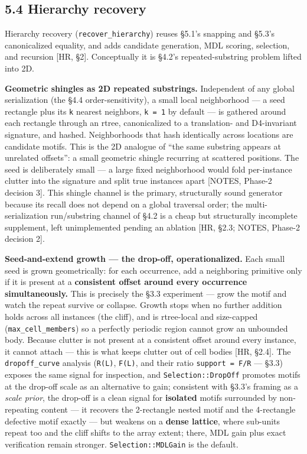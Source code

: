 \documentclass[
  11pt,
]{article}
\begin{document}
\subsection{5.4 Hierarchy recovery}\label{hierarchy-recovery-1}

Hierarchy recovery (\texttt{recover\_hierarchy}) reuses §5.1's snapping
and §5.3's canonicalized equality, and adds candidate generation, MDL
scoring, selection, and recursion {[}HR, §2{]}. Conceptually it is
§4.2's repeated-substring problem lifted into 2D.

\textbf{Geometric shingles as 2D repeated substrings.} Independent of
any global serialization (the §4.4 order-sensitivity), a small local
neighborhood --- a seed rectangle plus its \texttt{k} nearest neighbors,
\texttt{k\ =\ 1} by default --- is gathered around each rectangle
through an rtree, canonicalized to a translation- and D4-invariant
signature, and hashed. Neighborhoods that hash identically across
locations are candidate motifs. This is the 2D analogue of ``the same
substring appears at unrelated offsets'': a small geometric shingle
recurring at scattered positions. The seed is deliberately small --- a
large fixed neighborhood would fold per-instance clutter into the
signature and split true instances apart {[}NOTES, Phase-2 decision
3{]}. This shingle channel is the primary, structurally sound generator
because its recall does not depend on a global traversal order; the
multi-serialization run/substring channel of §4.2 is a cheap but
structurally incomplete supplement, left unimplemented pending an
ablation {[}HR, §2.3; NOTES, Phase-2 decision 2{]}.

\textbf{Seed-and-extend growth --- the drop-off, operationalized.} Each
small seed is grown geometrically: for each occurrence, add a
neighboring primitive only if it is present at a \textbf{consistent
offset around every occurrence simultaneously.} This is precisely the
§3.3 experiment --- grow the motif and watch the repeat survive or
collapse. Growth stops when no further addition holds across all
instances (the cliff), and is rtree-local and size-capped
(\texttt{max\_cell\_members}) so a perfectly periodic region cannot grow
an unbounded body. Because clutter is not present at a consistent offset
around every instance, it cannot attach --- this is what keeps clutter
out of cell bodies {[}HR, §2.4{]}. The \texttt{dropoff\_curve} analysis
(\texttt{R(L)}, \texttt{F(L)}, and their ratio \texttt{support\ =\ F/R}
--- §3.3) exposes the same signal for inspection, and
\texttt{Selection::DropOff} promotes motifs at the drop-off scale as an
alternative to gain; consistent with §3.3's framing as a \emph{scale
prior}, the drop-off is a clean signal for \textbf{isolated} motifs
surrounded by non-repeating content --- it recovers the 2-rectangle
nested motif and the 4-rectangle defective motif exactly --- but weakens
on a \textbf{dense lattice}, where sub-units repeat too and the cliff
shifts to the array extent; there, MDL gain plus exact verification
remain stronger. \texttt{Selection::MDLGain} is the default.
\end{document}
